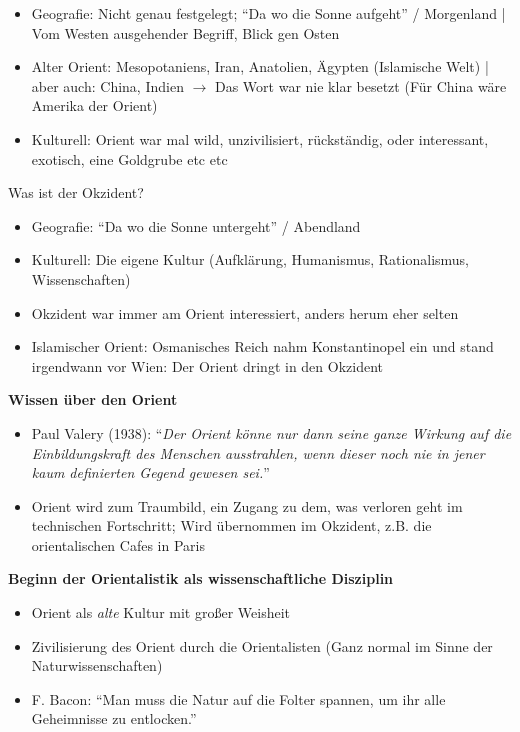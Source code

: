 \documentclass[emulatestandardclasses]{scrartcl}
\begin{document}
\begin{itemize}
  \item Geografie: Nicht genau festgelegt; "`Da wo die Sonne aufgeht"' / Morgenland | Vom Westen ausgehender Begriff, Blick gen Osten
  \item Alter Orient: Mesopotaniens, Iran, Anatolien, Ägypten (Islamische Welt) | aber auch: China, Indien $\rightarrow$ Das Wort war nie klar besetzt (Für China wäre Amerika der Orient)
  \item Kulturell: Orient war mal wild, unzivilisiert, rückständig, oder interessant, exotisch, eine Goldgrube etc etc
\end{itemize}

Was ist der Okzident?

\begin{itemize}
  \item Geografie: "`Da wo die Sonne untergeht"' / Abendland
  \item Kulturell: Die eigene Kultur (Aufklärung, Humanismus, Rationalismus, Wissenschaften)
  \item Okzident war immer am Orient interessiert, anders herum eher selten
  \item Islamischer Orient: Osmanisches Reich nahm Konstantinopel ein und stand irgendwann vor Wien: Der Orient dringt in den Okzident
\end{itemize}

\textbf{Wissen über den Orient}

\begin{itemize}
  \item Paul Valery (1938): "`\emph{Der Orient könne nur dann seine ganze Wirkung auf die Einbildungskraft des Menschen ausstrahlen, wenn dieser noch nie in jener kaum definierten Gegend gewesen sei.}"'
  \item Orient wird zum Traumbild, ein Zugang zu dem, was verloren geht im technischen Fortschritt; Wird übernommen im Okzident, z.B. die orientalischen Cafes in Paris
\end{itemize}

\textbf{Beginn der Orientalistik als wissenschaftliche Disziplin}

\begin{itemize}
  \item Orient als \emph{alte} Kultur mit großer Weisheit
  \item Zivilisierung des Orient durch die Orientalisten (Ganz normal im Sinne der Naturwissenschaften)
  \item F. Bacon: "`Man muss die Natur auf die Folter spannen, um ihr alle Geheimnisse zu entlocken."'
\end{itemize}
\end{document}
